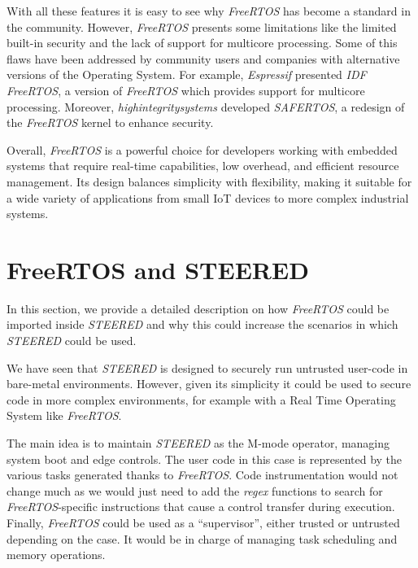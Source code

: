 With all these features it is easy to see why \textit{FreeRTOS} has become a standard
in the community. However, \textit{FreeRTOS} presents some limitations like the
limited built-in security and the lack of support for multicore processing. Some
of this flaws have been addressed by community users and companies with alternative
versions of the Operating System. For example, \textit{Espressif} presented
\textit{IDF FreeRTOS}\cite{idfrtos}, a version of \textit{FreeRTOS} which
provides support for multicore processing. Moreover, \textit{highintegritysystems}
developed \textit{SAFERTOS}\cite{safertos}, a redesign of the \textit{FreeRTOS} kernel
to enhance security.

Overall, \textit{FreeRTOS} is a powerful choice for developers working with embedded
systems that require real-time capabilities, low overhead, and efficient resource
management. Its design balances simplicity with flexibility, making it suitable for
a wide variety of applications from small IoT devices to more complex industrial
systems.

\section{FreeRTOS and STEERED}
\label{sec:rtos_porting}

In this section, we provide a detailed description on how \textit{FreeRTOS}
could be imported inside \textit{STEERED} and why this could increase the scenarios
in which \textit{STEERED} could be used.

We have seen that \textit{STEERED} is designed to securely run untrusted user-code
in bare-metal environments. However, given its simplicity it could be used to secure
code in more complex environments, for example with a Real Time Operating System
like \textit{FreeRTOS}.

The main idea is to maintain \textit{STEERED} as the M-mode operator, managing system
boot and edge controls. The user code in this case is represented by the various
tasks generated thanks to \textit{FreeRTOS}. Code instrumentation would not
change much as we would just need to add the \textit{regex} functions to search for
\textit{FreeRTOS}-specific instructions that cause a control transfer during
execution. Finally, \textit{FreeRTOS} could be used as a ``supervisor'', either
trusted or untrusted depending on the case. It would be in charge of managing task
scheduling and memory operations.

